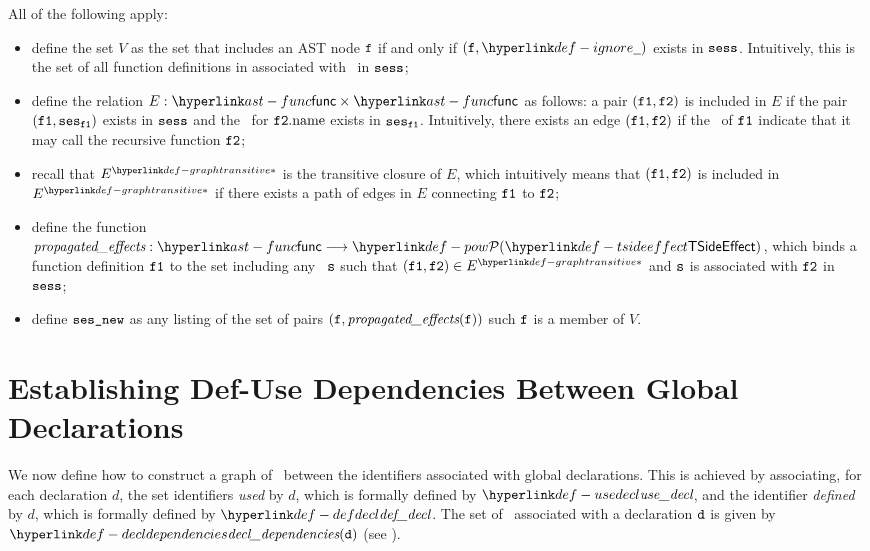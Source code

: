 \ProseParagraph
All of the following apply:
\begin{itemize}
  \item define the set $V$ as the set that includes an AST node $\vf$ if and only if $(\vf, \Ignore)$ exists in $\vsess$.
        Intuitively, this is the set of all function definitions in associated with \sideeffectconflictsterm\ in $\vsess$;
  \item define the relation $E : \func \times \func$ as follows:
        a pair $(\vfone, \vftwo)$ is included in $E$ if the pair $(\vfone, \vses_\vfone)$ exists in $\vsess$
        and the \RecursiveCallTerm\ for $\vftwo.\funcname$ exists in $\vses_\vfone$.
        Intuitively, there exists an edge $(\vfone, \vftwo)$ if the \sideeffectconflictsterm\ of $\vfone$ indicate that it
        may call the recursive function $\vftwo$;
  \item recall that $\graphtransitive{E}$ is the transitive closure of $E$, which intuitively means that
        $(\vfone, \vftwo)$ is included in $\graphtransitive{E}$ if there exists a path of edges in $E$ connecting $\vfone$
        to $\vftwo$;
  \item define the function $\propagatedeffects : \func \aslto \TSideEffectSet$, which binds a function definition $\vfone$
        to the set including any \sideeffectconflictterm\ $\vs$ such that $(\vfone, \vftwo) \in \graphtransitive{E}$ and
        $\vs$ is associated with $\vftwo$ in $\vsess$;
  \item define $\vsesnew$ as any listing of the set of pairs $(\vf, \propagatedeffects(\vf))$ such $\vf$ is a member of $V$.
\end{itemize}

\FormallyParagraph
\begin{mathpar}
\end{mathpar}

\section{Establishing Def-Use Dependencies Between Global Declarations\label{sec:TopologicalOrdering}}
We now define how to construct a graph of \ between the identifiers associated
with global declarations.
This is achieved by associating, for each declaration $d$, the set identifiers \emph{used} by $d$,
which is formally defined by $\usedecl$, and the identifier \emph{defined} by $d$,
which is formally defined by $\defdecl$.
%
The set of \ associated with a declaration $\vd$ is given by
$\decldependencies(\vd)$ (see ).

